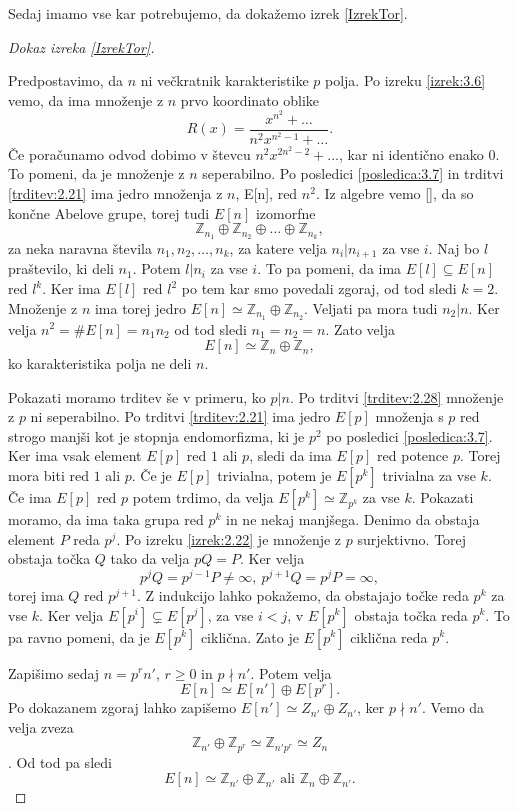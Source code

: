 \documentclass[12pt,a4paper,twoside]{article}
\theoremstyle{definition} %
\theoremstyle{plain} %
\numberwithin{equation}{section}  %
\newcommand{\Z}{\mathbb Z}
\begin{document}
Sedaj imamo vse kar potrebujemo, da dokažemo izrek \ref{IzrekTor}.

\begin{proof}[Dokaz izreka \ref{IzrekTor}]~

Predpostavimo, da $n$ ni večkratnik karakteristike $p$ polja. Po izreku \ref{izrek:3.6} vemo, da ima množenje z $n$ prvo koordinato oblike
$$R(x) = \frac{x^{n^2}+\ldots}{n^2x^{n^2-1}+ \ldots}.$$
Če poračunamo odvod dobimo v števcu $n^2x^{2n^2-2}+ \ldots$, kar ni identično enako $0$. To pomeni, da je množenje z $n$ seperabilno. Po posledici \ref{posledica:3.7} in trditvi \ref{trditev:2.21} ima jedro množenja z $n$, E[n], red $n^2$. Iz algebre vemo [], da so končne Abelove grupe, torej tudi  $E[n]$ izomorfne
$$\Z_{n_1} \oplus \Z_{n_2} \oplus \ldots \oplus \Z_{n_k},$$
za neka naravna števila $n_1,n_2,\ldots,n_k$, za katere velja $n_i|n_{i+1}$  za vse $i$. Naj bo $l$ praštevilo, ki deli $n_1$. Potem $l|n_i$ za vse $i$. To pa pomeni, da ima $E[l] \subseteq E[n]$ red $l^k$. Ker ima $E[l]$ red $l^2$ po tem kar smo povedali zgoraj, od tod sledi $k=2$. Množenje z $n$ ima torej jedro $E[n] \simeq \Z_{n_1} \oplus \Z_{n_2}$. Veljati pa mora tudi $n_2|n$. Ker velja $n^2=\#E[n] = n_1n_2$ od tod sledi $n_1=n_2=n$. Zato velja
$$E[n] \simeq \Z_n \oplus \Z_n,$$
ko karakteristika polja ne deli $n$.

Pokazati moramo trditev še v primeru, ko $p|n$. Po trditvi \ref{trditev:2.28} množenje z $p$ ni seperabilno. Po trditvi \ref{trditev:2.21} ima jedro $E[p]$ množenja s $p$ red strogo manjši kot je stopnja endomorfizma, ki je $p^2$ po posledici \ref{posledica:3.7}. Ker ima vsak element $E[p]$ red $1$ ali $p$, sledi da ima $E[p]$ red potence $p$. Torej mora biti red $1$ ali $p$. Če je $E[p]$ trivialna, potem je $E[p^k]$ trivialna za vse $k$. Če ima $E[p]$ red $p$ potem trdimo, da velja $E[p^k] \simeq \Z_{p ^k}$ za vse $k$. Pokazati moramo, da ima taka grupa red $p^k$ in ne nekaj manjšega. Denimo da obstaja element $P$ reda $p^j$. Po izreku \ref{izrek:2.22} je množenje z $p$ surjektivno. Torej obstaja točka $Q$ tako da velja $pQ = P$. Ker velja
$$p^jQ = p^{j-1}P \neq \infty, \ p^{j+1}Q = p^jP = \infty,$$
torej ima $Q$ red $p^{j+1}$. Z indukcijo lahko pokažemo, da obstajajo točke reda $p^k$ za vse $k$.
Ker velja $E[p^{i}] \subsetneq E[p^j]$, za vse $i < j$, v $E[p^k]$ obstaja točka reda $p^k$. To pa ravno pomeni, da je $E[p^k]$ ciklična. Zato je $E[p^k]$ ciklična reda $p^k$.

Zapišimo sedaj $n=p^rn'$, $r\geq0$ in $p\nmid n'$. Potem velja
$$E[n] \simeq E[n'] \oplus E[p^r].$$
Po dokazanem zgoraj lahko zapišemo $E[n'] \simeq Z_{n'} \oplus Z_{n'}$, ker $p \nmid n'$. Vemo da velja zveza
$$\Z_{n'} \oplus \Z_{p^r} \simeq \Z_{n'p^r} \simeq Z_n$$.
Od tod pa sledi
$$E[n] \simeq \Z_{n'} \oplus \Z_{n'} \text{ ali } \Z_n \oplus \Z_{n'}.$$
\end{proof}
\end{document}
